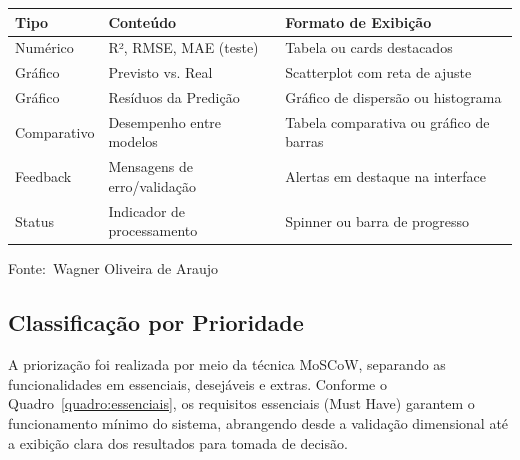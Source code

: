\documentclass[12pt,a4paper]{article}
\newcommand{\oautor}{Wagner Oliveira de Araujo}
\begin{document}
\begin{quadro}[ht]
\centering
\small
\caption{Saídas esperadas do sistema}
\label{quadro:saidas}
\begin{threeparttable}
\begin{tabularx}{\textwidth}{|l|l|X|} \hline
\textbf{Tipo} & \textbf{Conteúdo} & \textbf{Formato de Exibição} \\ \hline
Numérico & R², RMSE, MAE (teste) & Tabela ou cards destacados \\ \hline
Gráfico & Previsto vs. Real & Scatterplot com reta de ajuste \\ \hline
Gráfico & Resíduos da Predição & Gráfico de dispersão ou histograma \\ \hline
Comparativo & Desempenho entre modelos & Tabela comparativa ou gráfico de barras \\ \hline
Feedback & Mensagens de erro/validação & Alertas em destaque na interface \\ \hline
Status & Indicador de processamento & Spinner ou barra de progresso \\ \hline
\end{tabularx}
\begin{tablenotes}[flushleft]
\footnotesize
\item Fonte:~\oautor
\end{tablenotes}
\end{threeparttable}
\end{quadro}

\newpage
\subsection{Classificação por Prioridade}

A priorização foi realizada por meio da técnica MoSCoW, separando as funcionalidades em essenciais, desejáveis e extras. Conforme o Quadro~\ref{quadro:essenciais}, os requisitos essenciais (Must Have) garantem o funcionamento mínimo do sistema, abrangendo desde a validação dimensional até a exibição clara dos resultados para tomada de decisão.
\end{document}
